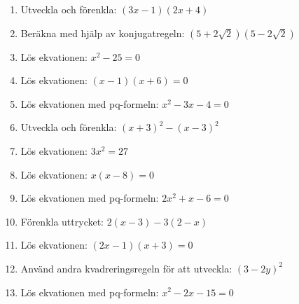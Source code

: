 \documentclass[a4paper,11pt]{article}
\begin{document}
\begin{enumerate}[label=\textbf{\arabic*.}]
    \item Utveckla och förenkla: $(3x - 1)(2x + 4)$
    
    \item Beräkna med hjälp av konjugatregeln: $(5 + 2\sqrt{2})(5 - 2\sqrt{2})$
    
    \item Lös ekvationen: $x^2 - 25 = 0$
    
    \item Lös ekvationen: $(x - 1)(x + 6) = 0$
    
    \item Lös ekvationen med pq-formeln: $x^2 - 3x - 4 = 0$
    
    \item Utveckla och förenkla: $(x + 3)^2 - (x - 3)^2$
    
    \item Lös ekvationen: $3x^2 = 27$
    
    \item Lös ekvationen: $x(x - 8) = 0$
    
    \item Lös ekvationen med pq-formeln: $2x^2 + x - 6 = 0$ 
    
    \item Förenkla uttrycket: $2(x - 3) - 3(2 - x)$
    
    \item Lös ekvationen: $(2x - 1)(x + 3) = 0$
    
    \item Använd andra kvadreringsregeln för att utveckla: $(3 - 2y)^2$
    
    \item Lös ekvationen med pq-formeln: $x^2 - 2x - 15 = 0$
\end{enumerate}
\end{document}

